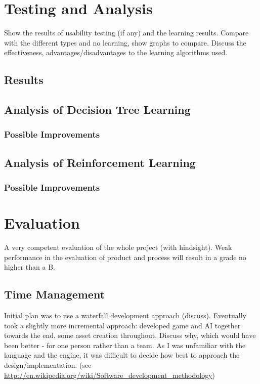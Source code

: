 \documentclass[runningheads,a4paper]{llncs}
\begin{document}
\section{Testing and Analysis}

Show the results of usability testing (if any) and the learning results. Compare with the different types and no learning, show graphs to compare. Discuss the effectiveness, advantages/disadvantages to the learning algorithms used.

	\subsection{Results}
	\subsection{Analysis of Decision Tree Learning}
		\subsubsection{Possible Improvements}
	\subsection{Analysis of Reinforcement Learning}
		\subsubsection{Possible Improvements}
	
\section{Evaluation}
A very competent evaluation of the whole project (with hindsight). Weak performance in the evaluation of product and process will result in a grade no higher than a B.

	\subsection{Time Management}
		Initial plan was to use a waterfall development approach (discuss). Eventually took a slightly more incremental approach: developed game and AI together towards the end, some asset creation throughout. Discuss why, which would have been better - for one person rather than a team. As I was unfamiliar with the language and the engine, it was difficult to decide how best to approach the design/implementation. (see \url{http://en.wikipedia.org/wiki/Software_development_methodology})
		
\end{document}
